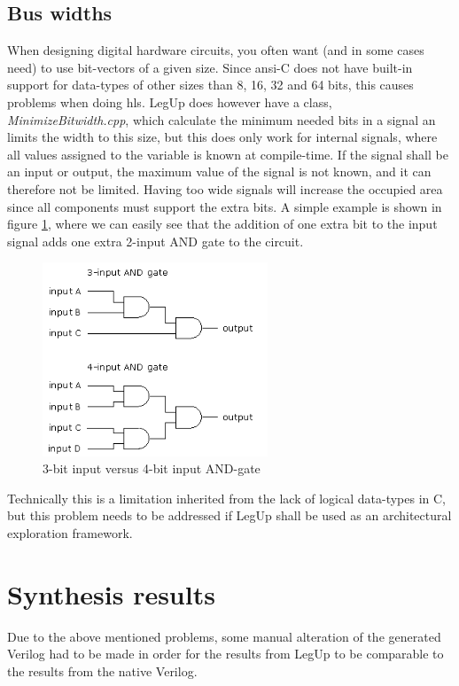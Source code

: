 \subsection{Bus widths}
When designing digital hardware circuits, you often want (and in some cases need) to use bit-vectors of a given size. Since \gls{ansi}-C does not have built-in support for data-types of other sizes than 8, 16, 32 and 64 bits, this causes problems when doing \gls{hls}. LegUp does however have a class, \textit{MinimizeBitwidth.cpp}, which calculate the minimum needed bits in a signal an limits the width to this size, but this does only work for internal signals, where all values assigned to the variable is known at compile-time. If the signal shall be an input or output, the maximum value of the signal is not known, and it can therefore not be limited. Having too wide signals will increase the occupied area since all components must support the extra bits. A simple example is shown in figure \ref{fig:andgate34}, where we can easily see that the addition of one extra bit to the input signal adds one extra 2-input AND gate to the circuit.
\begin{figure}[hbpt]
\centering
\includegraphics[width=0.6\textwidth]{../figs/AndGate34Bit.png}
\caption{\label{fig:andgate34}3-bit input versus 4-bit input AND-gate}
\end{figure}
Technically this is a limitation inherited from the lack of logical data-types in C, but this problem needs to be addressed if LegUp shall be used as an architectural exploration framework.
\section{\label{sec:synthres}Synthesis results}
Due to the above mentioned problems, some manual alteration of the generated Verilog had to be made in order for the results from LegUp to be comparable to the results from the native Verilog.
